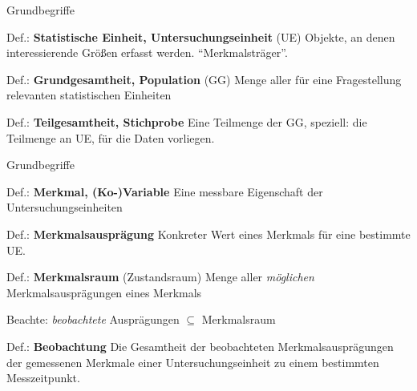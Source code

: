 \documentclass[
  10pt,
  ignorenonframetext,
]{beamer}
\begin{document}
\begin{frame}{Grundbegriffe}
\label{grundbegriffe}
\begin{block}{Def.: \textbf{Statistische Einheit, Untersuchungseinheit}
(UE)}
\label{def.-statistische-einheit-untersuchungseinheit-ue}
Objekte, an denen interessierende Größen erfasst werden.
``Merkmalsträger''.
\end{block}

\begin{block}{Def.: \textbf{Grundgesamtheit, Population} (GG)}
\label{def.-grundgesamtheit-population-gg}
Menge aller für eine Fragestellung relevanten statistischen Einheiten
\end{block}

\begin{block}{Def.: \textbf{Teilgesamtheit, Stichprobe}}
\label{def.-teilgesamtheit-stichprobe}
Eine Teilmenge der GG, speziell: die Teilmenge an UE, für die Daten
vorliegen.
\end{block}
\end{frame}

\begin{frame}{Grundbegriffe}
\label{grundbegriffe-1}
\begin{block}{Def.: \textbf{Merkmal, (Ko-)Variable}}
\label{def.-merkmal-ko-variable}
Eine messbare Eigenschaft der Untersuchungseinheiten
\end{block}

\begin{block}{Def.: \textbf{Merkmalsausprägung}}
\label{def.-merkmalsauspruxe4gung}
Konkreter Wert eines Merkmals für eine bestimmte UE.
\end{block}

\begin{block}{Def.: \textbf{Merkmalsraum} (Zustandsraum)}
\label{def.-merkmalsraum-zustandsraum}
Menge aller \emph{möglichen} Merkmalsausprägungen eines Merkmals
\end{block}

Beachte: \emph{beobachtete} Ausprägungen \(\subseteq\) Merkmalsraum

\begin{block}{Def.: \textbf{Beobachtung}}
\label{def.-beobachtung}
Die Gesamtheit der beobachteten Merkmalsausprägungen der gemessenen
Merkmale einer Untersuchungseinheit zu einem bestimmten Messzeitpunkt.
\end{block}

\end{frame}
\end{document}
